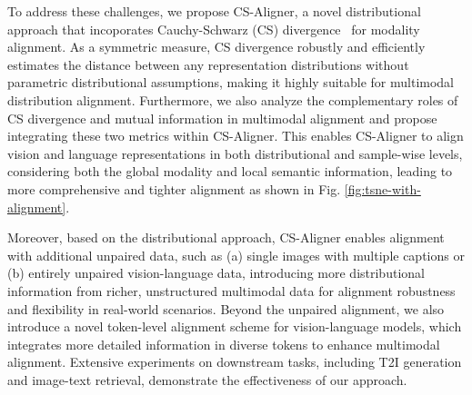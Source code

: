 To address these challenges, we propose CS-Aligner, a novel distributional approach that incoporates Cauchy-Schwarz (CS) divergence~\cite{principe2000learning} for modality alignment.
As a symmetric measure, CS divergence robustly and efficiently estimates the distance between any representation distributions 
without parametric distributional assumptions, making it highly suitable for multimodal distribution alignment.
Furthermore, we also analyze the complementary roles of CS divergence and mutual information in multimodal alignment and propose integrating these two metrics within CS-Aligner.
This enables CS-Aligner to align vision and language representations in both distributional and sample-wise levels, considering both the global modality and local semantic information, leading to more comprehensive and tighter alignment as shown in Fig. \ref{fig:tsne-with-alignment}.



Moreover, based on the distributional approach,
CS-Aligner enables alignment with additional unpaired data, such as (a) single images with multiple captions or (b) entirely unpaired vision-language data, 
introducing more distributional information from richer, unstructured multimodal data for alignment robustness and flexibility in real-world scenarios.
Beyond the unpaired alignment, we also introduce a novel token-level alignment scheme for vision-language models, which integrates more detailed information in diverse tokens to enhance multimodal alignment.
 Extensive experiments on downstream tasks, including T2I generation and image-text retrieval, demonstrate the effectiveness of our approach. 
 

